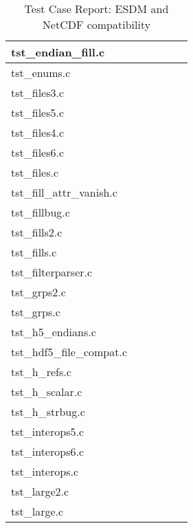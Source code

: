 \begin{table}[H]
\begin{tabular}{|m{2cm}|m{3cm}|m{3cm}|m{3cm}|m{3cm}|m{2cm}|}
tst\_endian\_fill.c   &   &   &   &   &   \\ \hline
tst\_enums.c   &   &   &   &   &   \\ \hline
tst\_files3.c   &   &   &   &   &   \\ \hline
tst\_files5.c   &   &   &   &   &   \\ \hline
tst\_files4.c   &   &   &   &   &   \\ \hline
tst\_files6.c   &   &   &   &   &   \\ \hline
tst\_files.c   &   &   &   &   &   \\ \hline
tst\_fill\_attr\_vanish.c   &   &   &   &   &   \\ \hline
tst\_fillbug.c   &   &   &   &   &   \\ \hline
tst\_fills2.c   &   &   &   &   &   \\ \hline
tst\_fills.c   &   &   &   &   &   \\ \hline
tst\_filterparser.c   &   &   &   &   &   \\ \hline
tst\_grps2.c   &   &   &   &   &   \\ \hline
tst\_grps.c   &   &   &   &   &   \\ \hline
tst\_h5\_endians.c   &   &   &   &   &   \\ \hline
tst\_hdf5\_file\_compat.c   &   &   &   &   &   \\ \hline
tst\_h\_refs.c   &   &   &   &   &   \\ \hline
tst\_h\_scalar.c   &   &   &   &   &   \\ \hline
tst\_h\_strbug.c   &   &   &   &   &   \\ \hline
tst\_interops5.c   &   &   &   &   &   \\ \hline
tst\_interops6.c   &   &   &   &   &   \\ \hline
tst\_interops.c   &   &   &   &   &   \\ \hline
tst\_large2.c   &   &   &   &   &   \\ \hline
tst\_large.c   &   &   &   &   &   \\ \hline
\hline
\end{tabular}
\caption{Test Case Report: ESDM and NetCDF compatibility}
\end{table}

\clearpage

